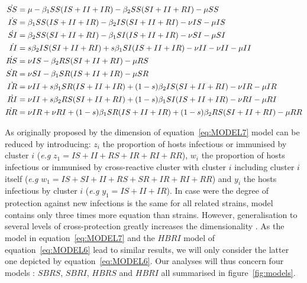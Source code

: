 \begin{align}
\dot{SS} & = \mu -\beta_1 SS (IS + II + IR) -\beta_2 SS (SI+ II + RI) -\mu SS  \label{eq:MODEL7}\\
\dot{IS} & = \beta_1 SS (IS+ II + IR) -\beta_2 IS (SI+ II + RI) -\nu IS -\mu IS \notag \\
\dot{SI} & = \beta_2 SS (SI+ II + RI) -\beta_1 SI (IS+ II + IR) -\nu SI -\mu SI \notag \\
\dot{II} & = s \beta_2 IS (SI+ II + RI) + s \beta_1 SI (IS+ II + IR) -\nu II -\nu II -\mu II \notag \\
\dot{RS} & = \nu IS -\beta_2 RS (SI+ II + RI) -\mu RS \notag \\
\dot{SR} & = \nu SI -\beta_1 SR (IS+ II + IR) -\mu SR \notag \\
\dot{IR} & = \nu II + s \beta_1 SR (IS+ II + IR) + (1-s) \beta_2 IS (SI+ II +RI) -\nu IR -\mu IR \notag \\
\dot{RI} & = \nu II + s \beta_2 RS (SI+ II + RI) + (1-s) \beta_1 SI (IS+ II + IR) -\nu RI -\mu RI \notag \\
\dot{RR} & = \nu IR + \nu RI + (1-s) \beta_1 SR (IS+ II + IR) + (1-s) \beta_2 RS (SI+ II + RI) -\mu RR \notag 
\end{align}

As originally proposed by \citet{Gupta1998} the dimension of
equation~\ref{eq:MODEL7} model can be reduced by introducing: $z_i$ the
proportion of hosts infectious or immunised by cluster $i$
(\textit{e.g} $z_1=IS+II+RS+IR+RI+RR$), $w_i$ the proportion of hosts
infectious or immunised by cross-reactive cluster with cluster $i$
including cluster $i$ itself (\textit{e.g}
$w_1=IS+SI+II+RS+SR+IR+RI+RR$) and $y_i$ the hosts infectious by
cluster $i$ (\textit{e.g} $y_1=IS+II+IR$).
In case were the degree of protection against new infections is the
same for all related strains, \citet{Gupta1998} model contains only
three times more equation than strains. However, generalisation to
several levels of cross-protection greatly increases the
dimensionality \citep{Minayev2008, Minayev2009}. As the model in
equation~\ref{eq:MODEL7} and the $HBRI$ model of
equation~\ref{eq:MODEL6} lead to similar results, we will only
consider the latter one depicted by equation~\ref{eq:MODEL6}. Our
analyses will thus concern four models : $SBRS$, $SBRI$, $HBRS$ and
$HBRI$ all summarised in figure~\ref{fig:models}.



